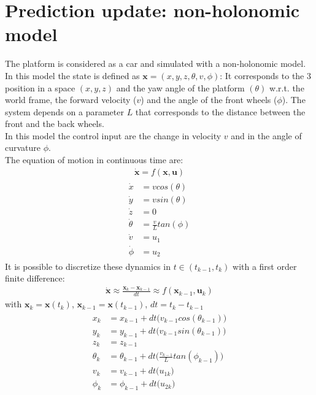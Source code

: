 \section{Prediction update: non-holonomic model}
The platform is considered as a car and simulated with a non-holonomic model. 
In this model the state is defined as $\boldsymbol{x} = (x, y, z,\theta , v, \phi)$:
It corresponds to the 3 position in a space $(x,y,z)$ and the yaw angle of the platform $(\theta)$ w.r.t. the world frame, the forward velocity ($v$) and the angle of the front wheels ($\phi$). The system depends on a parameter $L$ that corresponds to the distance between the front and the back wheels.\\
In this model the control input are the change in velocity $v$ and in the angle of curvature $\phi$. \\
The equation of motion in continuous time are:
\begin{align}
\boldsymbol{\dot{x}} = f(\boldsymbol{x},\boldsymbol{u}) \nonumber
\end{align}
\begin{align}
\begin{split}
\dot{x} &= v cos(\theta) \\
\dot{y} &= v sin(\theta) \\
\dot{z} &= 0 \\
\dot{\theta} &= \frac{v}{L}tan(\phi)\\
\dot{v} &= u_1 \\
\dot{\phi} &= u_2 
\end{split}
\end{align}
It is possible to discretize these dynamics in $t \in (t_{k-1}, t_k)$ with a first order finite difference:
\begin{align}
\boldsymbol{\dot{x}} \approx \frac{\boldsymbol{x}_k - \boldsymbol{x}_{k-1} }{dt} \approx f(\boldsymbol{x}_{k-1},\boldsymbol{u}_k) \nonumber
\end{align}
with $\boldsymbol{x}_k = \boldsymbol{x}(t_k)$, $\boldsymbol{x}_{k-1} = \boldsymbol{x}(t_{k-1})$, $dt = t_k - t_{k-1}$
\begin{align}
\begin{split}
x_k &= x_{k-1} + dt \big(v_{k-1} cos(\theta_{k-1})\big) \\
y_k &= y_{k-1} + dt \big(v_{k-1} sin(\theta_{k-1})\big) \\
z_k &= z_{k-1} \\
\theta_k &= \theta_{k-1} + dt\Big(\frac{v_{k-1}}{L}tan(\phi_{k-1}) \Big)\\
v_{k} &= v_{k-1} + dt \big(u_{1k}\big) \\
\phi_k &= \phi_{k-1} + dt \big(u_{2k}\big) 
\end{split}
\end{align}
